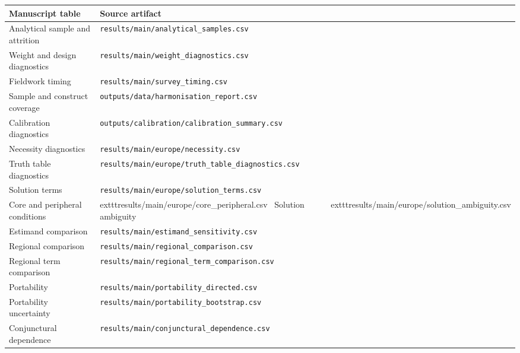 \begin{longtable}{ll}
\toprule
Manuscript table & Source artifact \\
\midrule
\endhead
Analytical sample and attrition & \texttt{results/main/analytical\_samples.csv} \\
Weight and design diagnostics & \texttt{results/main/weight\_diagnostics.csv} \\
Fieldwork timing & \texttt{results/main/survey\_timing.csv} \\
Sample and construct coverage & \texttt{outputs/data/harmonisation\_report.csv} \\
Calibration diagnostics & \texttt{outputs/calibration/calibration\_summary.csv} \\
Necessity diagnostics & \texttt{results/main/europe/necessity.csv} \\
Truth table diagnostics & \texttt{results/main/europe/truth\_table\_diagnostics.csv} \\
Solution terms & \texttt{results/main/europe/solution\_terms.csv} \\
Core and peripheral conditions & 	exttt{results/main/europe/core\_peripheral.csv} \
Solution ambiguity & 	exttt{results/main/europe/solution\_ambiguity.csv} \\
Estimand comparison & \texttt{results/main/estimand\_sensitivity.csv} \\
Regional comparison & \texttt{results/main/regional\_comparison.csv} \\
Regional term comparison & \texttt{results/main/regional\_term\_comparison.csv} \\
Portability & \texttt{results/main/portability\_directed.csv} \\
Portability uncertainty & \texttt{results/main/portability\_bootstrap.csv} \\
Conjunctural dependence & \texttt{results/main/conjunctural\_dependence.csv} \\
\bottomrule
\end{longtable}
